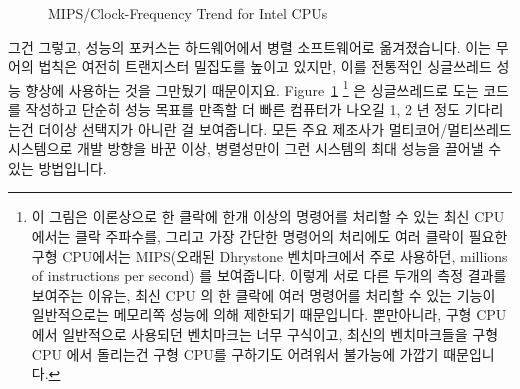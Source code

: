 \begin{figure}[tb]
\centering
{}
\caption{MIPS/Clock-Frequency Trend for Intel CPUs}
\label{fig:intro:Clock-Frequency Trend for Intel CPUs}
\end{figure}

그건 그렇고, 성능의 포커스는 하드웨어에서 병렬 소프트웨어로 옮겨졌습니다.
이는 무어의 법칙은 여전히 트랜지스터 밀집도를 높이고 있지만, 이를 전통적인
싱글쓰레드 성능 향상에 사용하는 것을 그만뒀기 때문이지요.
Figure~\ref{fig:intro:Clock-Frequency Trend for Intel CPUs} \footnote{
	이 그림은 이론상으로 한 클락에 한개 이상의 명령어를 처리할 수 있는 최신
	CPU 에서는 클락 주파수를, 그리고 가장 간단한 명령어의 처리에도 여러
	클락이 필요한 구형 CPU에서는 MIPS(오래된 Dhrystone 벤치마크에서 주로
	사용하던, millions of instructions per second) 를 보여줍니다.
	이렇게 서로 다른 두개의 측정 결과를 보여주는 이유는, 최신 CPU 의 한
	클락에 여러 명령어를 처리할 수 있는 기능이 일반적으로는 메모리쪽 성능에
	의해 제한되기 때문입니다.
	뿐만아니라, 구형 CPU 에서 일반적으로 사용되던 벤치마크는 너무 구식이고,
	최신의 벤치마크들을 구형 CPU 에서 돌리는건 구형 CPU를 구하기도 어려워서
	불가능에 가깝기 때문입니다.}
은 싱글쓰레드로 도는 코드를 작성하고 단순히 성능 목표를 만족할 더 빠른 컴퓨터가
나오길 1, 2 년 정도 기다리는건 더이상 선택지가 아니란 걸 보여줍니다.
모든 주요 제조사가 멀티코어/멀티쓰레드 시스템으로 개발 방향을 바꾼 이상,
병렬성만이 그런 시스템의 최대 성능을 끌어낼 수 있는 방법입니다.

